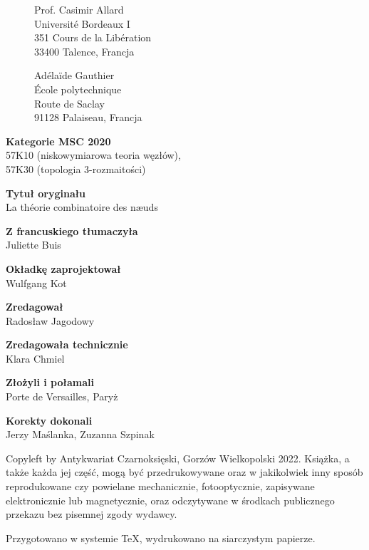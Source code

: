 

\thispagestyle{empty}
\begin{figure}[H]
\begin{minipage}[b]{.48\linewidth}
{\noindent Prof. Casimir Allard\\
Université Bordeaux I\\
351 Cours de la Libération\\
33400 Talence, Francja}
\end{minipage}
\begin{minipage}[b]{.48\linewidth}
{\noindent Adélaïde Gauthier\\
École polytechnique\\
Route de Saclay\\
91128 Palaiseau, Francja}
\end{minipage}
\end{figure}

{\noindent \textbf{Kategorie MSC 2020}\\57K10 (niskowymiarowa teoria węzłów),\\57K30 (topologia 3-rozmaitości)} \vspace{5mm}

{\noindent \textbf{Tytuł oryginału}\\La théorie combinatoire des næuds}
\vspace{5mm}

{\noindent \textbf{Z francuskiego tłumaczyła}\\Juliette Buis} 
\vspace{5mm}

{\noindent \textbf{Okładkę zaprojektował}\\Wulfgang Kot}
\vspace{5mm}

{\noindent \textbf{Zredagował}\\Radosław Jagodowy}
\vspace{5mm}

{\noindent \textbf{Zredagowała technicznie}\\Klara Chmiel}
\vspace{5mm}

{\noindent \textbf{Złożyli i połamali}\\Porte de Versailles, Paryż}
\vspace{5mm}

{\noindent \textbf{Korekty dokonali}\\Jerzy Maślanka, Zuzanna Szpinak}

\vfill

{\noindent Copyleft by Antykwariat Czarnoksięski, Gorzów Wielkopolski 2022.
Książka, a także każda jej część, mogą być przedrukowywane oraz w jakikolwiek inny sposób reprodukowane czy powielane mechanicznie, fotooptycznie, zapisywane elektronicznie lub magnetycznie, oraz odczytywane w środkach publicznego przekazu bez pisemnej zgody wydawcy.}

\vspace{5mm}

{\noindent Przygotowano w systemie \TeX, wydrukowano na siarczystym papierze.}


